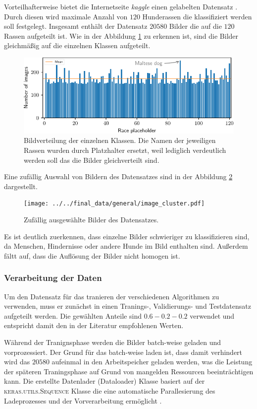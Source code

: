 Vorteilhafterweise bietet die Internetseite \emph{kaggle} einen gelabelten
Datensatz \cite{datensatz}. Durch diesen wird maximale Anzahl von $120$
Hunderassen die klassifiziert werden soll festgelegt. Insgesamt enthält der
Datensatz $20580$ Bilder die auf die $120$ Rassen aufgeteilt ist. Wie in der
Abbildung \ref{fig:gleichverteilung_bilder} zu erkennen ist, sind die Bilder
gleichmäßig auf die einzelnen Klassen aufgeteilt.
\begin{figure}
\centering
\includegraphics[width=\the\textwidth]{../../final_data/general/image_distribution.pdf}
\caption{Bildverteilung der einzelnen Klassen. Die Namen der jeweiligen Rassen
         wurden durch Platzhalter ersetzt, weil lediglich verdeutlich werden soll
         das die Bilder gleichverteilt sind.}
\label{fig:gleichverteilung_bilder}
\end{figure}
Eine zufällig Auswahl von Bildern des Datensatzes sind in der Abbildung \ref{fig:bilder_cluser}
dargestellt.
\begin{figure}
\centering
\texttt{[image: ../../final\_data/general/image\_cluster.pdf]}
\caption{Zufällig ausgewählte Bilder des Datensatzes.}
\label{fig:bilder_cluser}
\end{figure}
Es ist deutlich zuerkennen, dass einzelne Bilder schwieriger zu klassifizieren sind,
da Menschen, Hindernisse oder andere Hunde im Bild enthalten sind. Außerdem
fältt auf, dass die Auflösung der Bilder nicht homogen ist.

\subsubsection{Verarbeitung der Daten}
Um den Datensatz für das tranieren der verschiedenen Algorithmen zu verwenden,
muss er zunächst in einen Tranings-, Validierungs- und Testdatensatz aufgeteilt
werden. Die gewählten Anteile sind $0.6-0.2-0.2$ verwendet und entspricht damit
den in der Literatur \cite[S. 29]{hands_on_machine_learning} empfohlenen Werten.

Während der Tranignsphase werden die Bilder batch-weise geladen und vorprozessiert.
Der Grund für das batch-weise laden ist, dass damit verhindert wird das $20580$
aufeinmal in den Arbeitspeicher geladen werden, was die Leistung der späteren
Traningsphase auf Grund von mangelden Ressourcen beeinträchtigen kann. Die erstellte
Datenlader (Dataloader) Klasse basiert auf der \textsc{keras.utils.Sequence} Klasse die eine
automatische Parallesierung des Ladeprozesses und der Vorverarbeitung ermöglicht
\cite{keras_sequentiel}.

